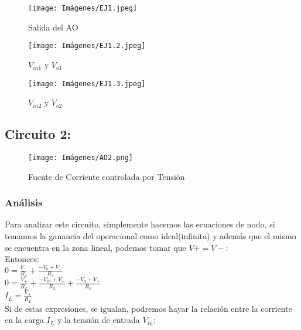         \begin{figure}[ht]
        	\centering
        	\texttt{[image: Imágenes/EJ1.jpeg]}
        	\caption{Salida del AO}
        \end{figure}

        \begin{figure}[H]
        	\centering
        	\texttt{[image: Imágenes/EJ1.2.jpeg]}
        	\caption{$V_{in1}$ y $V_{o1}$}
        \end{figure}

        \begin{figure}[H]
        	\centering
        	\texttt{[image: Imágenes/EJ1.3.jpeg]}
        	\caption{$V_{in2}$ y $V_{o2}$}
        \end{figure}


    \newpage
    \subsection{Circuito 2:}
    \begin{figure}[ht]
    	\centering
    	\texttt{[image: Imágenes/AO2.png]}
    	\caption{Fuente de Corriente controlada por Tensión}
    \end{figure}
        \subsubsection{Análisis}
        Para analizar este circuito, simplemente hacemos las ecuaciones de nodo, si tomamos la ganancia del operacional como ideal(infinita) y además que el mismo se encuentra en la zona lineal, podemos tomar que $V+ = V-$:\\
        Entonces:\\
        
        $0 = \frac{V_{-}}{R_{4}} + \frac{- V_{o} + V_{-}}{R_{2}}$\\
        
        $0 = \frac{V_{+}}{R_{L}} + \frac{- V_{in} + V_{+}}{R_{3}} + \frac{- V_{o} + V_{+}}{R_{1}}$\\

        $I_L = \frac{V_{+}}{R_L}$\\

        Si de estas expresiones, se igualan, podremos hayar la relación entre la corriente en la carga $I_L$ y la tensión de entrada $V_{in}$:\\
        
        \begin{center}
            \\
        \end{center}

